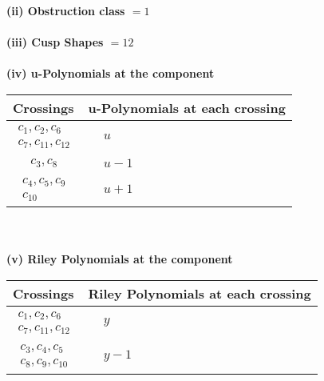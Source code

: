 \documentclass[1p]{elsarticle_modified}
\theoremstyle{definition}
\begin{document}
\flushleft \textbf{(ii) Obstruction class $= 1$}\\~\\
\flushleft \textbf{(iii) Cusp Shapes $= 12$}\\~\\
\newpage\renewcommand{\arraystretch}{1}
\flushleft \textbf{(iv) u-Polynomials at the component}\newline \\
\begin{tabular}{m{50pt}|m{274pt}}
Crossings & \hspace{64pt}u-Polynomials at each crossing \\
\hline $$\begin{aligned}c_{1},c_{2},c_{6}\\c_{7},c_{11},c_{12}\end{aligned}$$&$\begin{aligned}
&u
\end{aligned}$\\
\hline $$\begin{aligned}c_{3},c_{8}\end{aligned}$$&$\begin{aligned}
&u-1
\end{aligned}$\\
\hline $$\begin{aligned}c_{4},c_{5},c_{9}\\c_{10}\end{aligned}$$&$\begin{aligned}
&u+1
\end{aligned}$\\
\hline
\end{tabular}\\~\\
\newpage\renewcommand{\arraystretch}{1}
\flushleft \textbf{(v) Riley Polynomials at the component}\newline \\
\begin{tabular}{m{50pt}|m{274pt}}
Crossings & \hspace{64pt}Riley Polynomials at each crossing \\
\hline $$\begin{aligned}c_{1},c_{2},c_{6}\\c_{7},c_{11},c_{12}\end{aligned}$$&$\begin{aligned}
&y
\end{aligned}$\\
\hline $$\begin{aligned}c_{3},c_{4},c_{5}\\c_{8},c_{9},c_{10}\end{aligned}$$&$\begin{aligned}
&y-1
\end{aligned}$\\
\hline
\end{tabular}\\~\\
\end{document}
